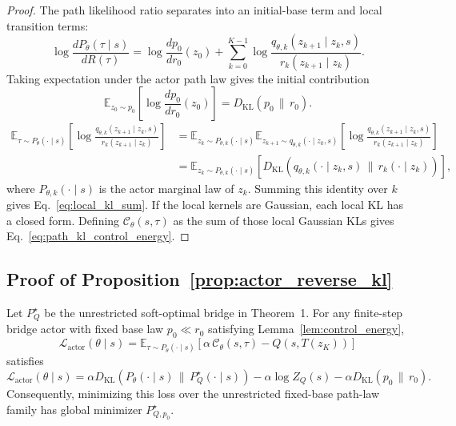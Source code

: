 \documentclass[11pt]{article}
\begin{document}
\begin{proof}
The path likelihood ratio separates into an initial-base term and local transition terms:
\begin{equation}
  \log
  \frac{
    dP_\theta(\tau\mid s)
  }{
    dR(\tau)
  }
  =
  \log
  \frac{
    dp_0
  }{
    dr_0
  }(z_0)
  +
  \sum_{k=0}^{K-1}
  \log
  \frac{
    q_{\theta,k}(z_{k+1}\mid z_k,s)
  }{
    r_k(z_{k+1}\mid z_k)
  }.
\end{equation}
Taking expectation under the actor path law gives the initial contribution
\begin{equation}
  \mathbb E_{z_0\sim p_0}
  \left[
    \log
    \frac{
      dp_0
    }{
      dr_0
    }(z_0)
  \right]
  =
  D_{\mathrm{KL}}
  \left(
    p_0
    \,\|\,
    r_0
  \right).
\end{equation}
\begin{align}
  \mathbb E_{\tau\sim P_\theta(\cdot\mid s)}
  \left[
    \log
    \frac{
      q_{\theta,k}(z_{k+1}\mid z_k,s)
    }{
      r_k(z_{k+1}\mid z_k)
    }
  \right]
  &=
  \mathbb E_{z_k\sim P_{\theta,k}(\cdot\mid s)}
  \mathbb E_{z_{k+1}\sim q_{\theta,k}(\cdot\mid z_k,s)}
  \left[
    \log
    \frac{
      q_{\theta,k}(z_{k+1}\mid z_k,s)
    }{
      r_k(z_{k+1}\mid z_k)
    }
  \right]
  \nonumber\\
  &=
  \mathbb E_{z_k\sim P_{\theta,k}(\cdot\mid s)}
  \left[
    D_{\mathrm{KL}}
    \left(
      q_{\theta,k}(\cdot\mid z_k,s)
      \,\|\,r_k(\cdot\mid z_k)
    \right)
  \right],
\end{align}
where $P_{\theta,k}(\cdot\mid s)$ is the actor marginal law of $z_k$. Summing this identity over $k$ gives Eq.~\eqref{eq:local_kl_sum}. If the local kernels are Gaussian, each local KL has a closed form. Defining $\mathcal C_\theta(s,\tau)$ as the sum of those local Gaussian KLs gives Eq.~\eqref{eq:path_kl_control_energy}.
\end{proof}

\subsection{Proof of Proposition~\ref{prop:actor_reverse_kl}}
\label{app:proof_actor_projection}

\begin{restatement}
Let $P_Q^\star$ be the unrestricted soft-optimal bridge in Theorem~1. For any finite-step bridge actor with fixed base law $p_0\ll r_0$ satisfying Lemma~\ref{lem:control_energy},
\[
  \mathcal L_{\mathrm{actor}}(\theta\mid s)
  =
  \mathbb E_{\tau\sim P_\theta(\cdot\mid s)}
  \left[
    \alpha\,\mathcal C_\theta(s,\tau)
    -
    Q(s,T(z_K))
  \right]
\]
satisfies
\[
  \mathcal L_{\mathrm{actor}}(\theta\mid s)
  =
  \alpha
  D_{\mathrm{KL}}
  \left(
    P_\theta(\cdot\mid s)
    \,\|\,P_Q^\star(\cdot\mid s)
  \right)
  -
  \alpha\log Z_Q(s)
  -
  \alpha
  D_{\mathrm{KL}}
  \left(
    p_0
    \,\|\,
    r_0
  \right).
\]
Consequently, minimizing this loss over the unrestricted fixed-base path-law family has global minimizer $P_{Q,p_0}^\star$.

\end{restatement}
\end{document}

